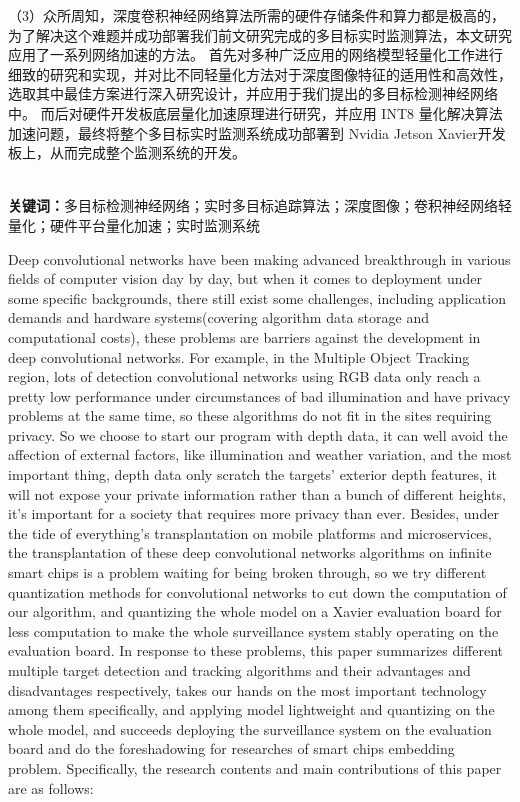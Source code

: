 （3）众所周知，深度卷积神经网络算法所需的硬件存储条件和算力都是极高的，为了解决这个难题并成功部署我们前文研究完成的多目标实时监测算法，本文研究应用了一系列网络加速的方法。
首先对多种广泛应用的网络模型轻量化工作进行细致的研究和实现，并对比不同轻量化方法对于深度图像特征的适用性和高效性，选取其中最佳方案进行深入研究设计，并应用于我们提出的多目标检测神经网络中。
而后对硬件开发板底层量化加速原理进行研究，并应用 INT8 量化解决算法加速问题，最终将整个多目标实时监测系统成功部署到 Nvidia Jetson Xavier开发板上，从而完成整个监测系统的开发。

 \ \\
\textbf{关键词：}多目标检测神经网络；实时多目标追踪算法；深度图像；卷积神经网络轻量化；硬件平台量化加速；实时监测系统


\cleardoublepage

\vspace{-6mm}
\vspace{3mm}

Deep convolutional networks have been making advanced breakthrough in various fields of computer vision day by day, 
but when it comes to deployment under some specific backgrounds, there still exist some challenges, including application demands and 
hardware systems(covering algorithm data storage and computational costs), these problems are barriers against the development in deep convolutional 
networks. For example, in the Multiple Object Tracking region, lots of detection convolutional networks using RGB data only reach a pretty low 
performance under circumstances of bad illumination and have privacy problems at the same time, so these algorithms do not fit in the sites requiring 
privacy. So we choose to start our program with depth data, it can well avoid the affection of external factors, like illumination and weather variation,
 and the most important thing, depth data only scratch the targets' exterior depth features, 
it will not expose your private information rather than a bunch of different heights, it's important for a society that requires more privacy than ever.
Besides, under the tide of everything's transplantation on mobile platforms and microservices, the transplantation of these deep convolutional networks 
algorithms on infinite smart chips is a problem waiting for being broken through, so we try different quantization methods for convolutional networks 
to cut down the computation of our algorithm, and quantizing the whole model on a Xavier evaluation board for less computation to 
make the whole surveillance system stably operating on the evaluation board. In response to these problems, this paper summarizes different multiple 
target detection and tracking algorithms and their advantages and disadvantages respectively, takes our hands on the most important technology among 
them specifically, and applying model lightweight and quantizing on the whole model, and succeeds deploying the surveillance system on the 
evaluation board and do the foreshadowing for researches of smart chips embedding problem. Specifically, the research contents 
and main contributions of this paper are as follows:

